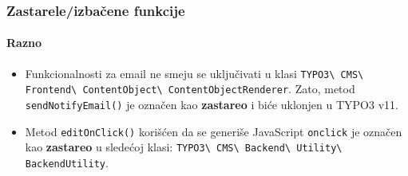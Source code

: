 
\begin{frame}[fragile]
	\frametitle{Zastarele/izbačene funkcije}
	\framesubtitle{Razno}

	\begin{itemize}
		\item Funkcionalnosti za email ne smeju se uključivati u klasi\newline
			\small
				\texttt{TYPO3\textbackslash
					CMS\textbackslash
					Frontend\textbackslash
					ContentObject\textbackslash
					ContentObjectRenderer}.\newline
			\normalsize
			Zato, metod \texttt{sendNotifyEmail()} je označen kao \textbf{zastareo} i biće uklonjen u TYPO3 v11.

		\item Metod \texttt{editOnClick()} korišćen da se generiše JavaScript \texttt{onclick}
			je označen kao \textbf{zastareo} u sledećoj klasi:\newline
			\small
				\texttt{TYPO3\textbackslash
					CMS\textbackslash
					Backend\textbackslash
					Utility\textbackslash
					BackendUtility}.
			\normalsize

	\end{itemize}

\end{frame}


